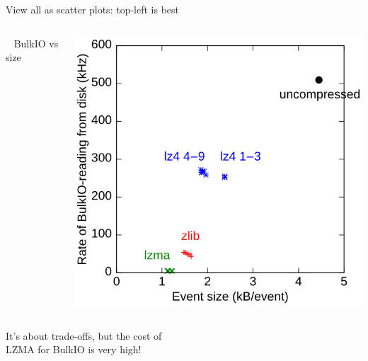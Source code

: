 \documentclass{beamer}
\begin{document}
\begin{frame}{View all as scatter plots: top-left is best}
\begin{columns}
\mbox{ } \hfill BulkIO vs size \hfill \mbox{ }

\includegraphics[width=\linewidth]{bulk.png}
\end{columns}

\vspace{-2\baselineskip}
It's about trade-offs, but the cost of \\ LZMA for BulkIO is very high!
\end{frame}
\end{document}
